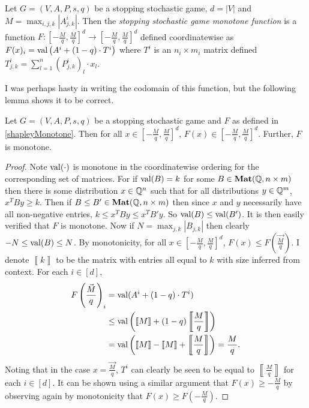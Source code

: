 \begin{definition} \label{shapleyMonotone}
  Let $G = (V, A, P, s, q)$ be a stopping stochastic game, $d = |V|$ and $M = \max_{i, j, k} |A_{j, k}^i|$. Then the
  \emph{stopping stochastic game monotone function} is a function
  $F : [-\frac{M}{q}, \frac{M}{q}]^d \to [-\frac{M}{q}, \frac{M}{q}]^d$ defined coordinatewise as
  $F(x)_i =  \mathrm{val} \left( A^i + (1 - q) \cdot T^i \right)$ where $T^i$ is an $n_i \times m_i$ matrix defined
  $T^i_{j, k} = \sum_{l = 1}^n (P_{j, k}^i)_l \cdot x_l$.
\end{definition}
I was perhaps hasty in writing the codomain of this function, but the following lemma
shows it to be correct.
\begin{lemma}
  Let $G = (V, A, P, s, q)$ be a stopping stochastic game and $F$ as defined in \cref{shapleyMonotone}.
  Then for all $x \in [-\frac{M}{q}, \frac{M}{q}]^d$, $F(x) \in [-\frac{M}{q}, \frac{M}{q}]^d$.
  Further, $F$ is monotone.
\end{lemma}
\newcommand{\mat}[1]{\left\llbracket #1 \right\rrbracket}
\begin{proof}
  Note $\mathrm{val}(\cdot)$ is monotone in the coordinatewise ordering
  for the corresponding set of matrices. For
  if $\mathrm{val}(B) = k$ for some $B \in \mathbf{Mat}(\mathbb{Q}, n \times m)$ then there is some
  distribution $x \in \mathbb{Q}^n$ such that for all distributions $y \in \mathbb{Q}^m$, $x^T B y \geq k$.
  Then if $B \leq B' \in \mathbf{Mat}(\mathbb{Q}, n \times m)$ then since $x$ and $y$ necessarily have
  all non-negative entries, $k \leq x^T B y \leq x^T B' y$. So $\mathrm{val}(B) \leq \mathrm{val}(B')$.
  It is then easily verified that $F$ is monotone.
  Now if $N = \max_{j, k} |B_{j, k}|$ then clearly $-N \leq \mathrm{val}(B) \leq N$.
  By monotonicity, for all $x \in [-\frac{M}{q}, \frac{M}{q}]^d$, $F(x) \leq F\left(\vec{\frac{M}{q}}\right)$.
  I denote $\mat{k}$ to be the matrix
  with entries all equal to $k$ with size inferred from context. For each $i \in [d]$,
  \begin{align*}
    F\left(\vec{\frac{M}{q}}\right)_i &= \val(A^i + (1 - q) \cdot T^i) \\
                               &\leq \val\left(\mat{M} + (1 - q) \mat{\frac{M}{q}}\right) \\
                               &= \val\left(\mat{M} - \mat{M} + \mat{\frac{M}{q}}\right) = \frac{M}{q}.
  \end{align*}
  Noting that in the case $x = \vec{\frac{M}{q}}$, $T^i$ can clearly be seen to be equal to $\mat{\frac{M}{q}}$ for
  each $i \in [d]$.
  It can be shown using a similar argument that $F(x) \geq -\frac{M}{q}$ by observing again by monotonicity
  that $F(x) \geq F\left(-\frac{M}{q}\right)$.
\end{proof}
